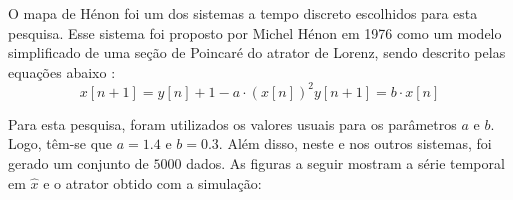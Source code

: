 \documentclass[9pt, technote]{article}
\begin{document}
O mapa de Hénon foi um dos sistemas a tempo discreto escolhidos para esta pesquisa. Esse sistema foi proposto por Michel Hénon em 1976 como um modelo simplificado de uma seção de Poincaré do atrator de Lorenz, sendo descrito pelas equações abaixo \cite{henon1976two}:
\begin{subequations}
\begin{equation}
x[n+1] = y[n] + 1 - a\cdot (x[n])^2
\end{equation}
\begin{equation}
y[n+1] = b \cdot x[n]
\end{equation}
\end{subequations}

Para esta pesquisa, foram utilizados os valores usuais para os parâmetros $a$ e $b$. Logo, têm-se que $a = 1.4$ e $b = 0.3$. Além disso, neste e nos outros sistemas, foi gerado um conjunto de $5000$ dados. As figuras a seguir mostram a série temporal em $\hat{x}$ e o atrator obtido com a simulação:
\end{document}
